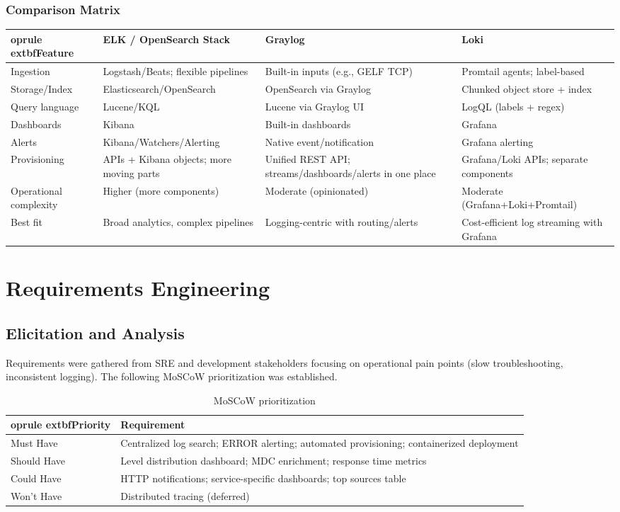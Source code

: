 \documentclass[12pt,a4paper]{report}
\begin{document}
\subsection*{Comparison Matrix}
\begin{longtable}{p{3.2cm} p{3.8cm} p{3.8cm} p{3.8cm}}
	oprule
	extbf{Feature} & \textbf{ELK / OpenSearch Stack} & \textbf{Graylog} & \textbf{Loki} \\
\midrule
\endhead
Ingestion & Logstash/Beats; flexible pipelines & Built-in inputs (e.g., GELF TCP) & Promtail agents; label-based \\
Storage/Index & Elasticsearch/OpenSearch & OpenSearch via Graylog & Chunked object store + index \\
Query language & Lucene/KQL & Lucene via Graylog UI & LogQL (labels + regex) \\
Dashboards & Kibana & Built-in dashboards & Grafana \\
Alerts & Kibana/Watchers/Alerting & Native event/notification & Grafana alerting \\
Provisioning & APIs + Kibana objects; more moving parts & Unified REST API; streams/dashboards/alerts in one place & Grafana/Loki APIs; separate components \\
Operational complexity & Higher (more components) & Moderate (opinionated) & Moderate (Grafana+Loki+Promtail) \\
Best fit & Broad analytics, complex pipelines & Logging-centric with routing/alerts & Cost-efficient log streaming with Grafana \\
\bottomrule
\end{longtable}

\chapter{Requirements Engineering}
\section{Elicitation and Analysis}
Requirements were gathered from SRE and development stakeholders focusing on operational pain points (slow troubleshooting, inconsistent logging). The following MoSCoW prioritization was established.

\begin{table}[H]
\centering
\begin{tabular}{p{3cm} p{11cm}}
	oprule
	extbf{Priority} & \textbf{Requirement} \\
\midrule
Must Have & Centralized log search; ERROR alerting; automated provisioning; containerized deployment \\
Should Have & Level distribution dashboard; MDC enrichment; response time metrics \\
Could Have & HTTP notifications; service-specific dashboards; top sources table \\
Won't Have & Distributed tracing (deferred) \\
\bottomrule
\end{tabular}
\caption{MoSCoW prioritization}
\end{table}
\end{document}
